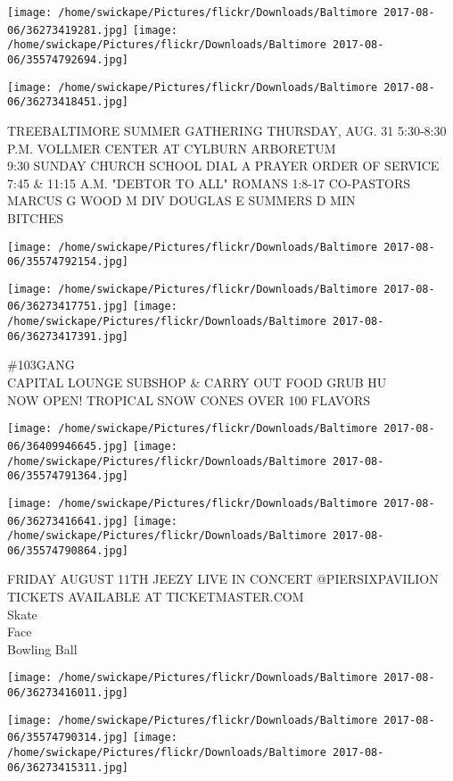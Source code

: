 \documentclass[10pt,letterpaper]{article}
\begin{document}
\texttt{[image: /home/swickape/Pictures/flickr/Downloads/Baltimore 2017-08-06/36273419281.jpg]}
\texttt{[image: /home/swickape/Pictures/flickr/Downloads/Baltimore 2017-08-06/35574792694.jpg]}

\texttt{[image: /home/swickape/Pictures/flickr/Downloads/Baltimore 2017-08-06/36273418451.jpg]}

TREEBALTIMORE SUMMER GATHERING THURSDAY, AUG. 31 5:30{-}8:30 P.M. VOLLMER CENTER AT CYLBURN ARBORETUM\\
9:30 SUNDAY CHURCH SCHOOL DIAL A PRAYER ORDER OF SERVICE 7:45 \& 11:15 A.M. "DEBTOR TO ALL" ROMANS 1:8{-}17 CO{-}PASTORS MARCUS G WOOD M DIV DOUGLAS E SUMMERS D MIN\\
BITCHES
\pagebreak

\texttt{[image: /home/swickape/Pictures/flickr/Downloads/Baltimore 2017-08-06/35574792154.jpg]}

\vspace{0.25in}
\texttt{[image: /home/swickape/Pictures/flickr/Downloads/Baltimore 2017-08-06/36273417751.jpg]}
\texttt{[image: /home/swickape/Pictures/flickr/Downloads/Baltimore 2017-08-06/36273417391.jpg]}

\#103GANG\\
CAPITAL LOUNGE SUBSHOP \& CARRY OUT FOOD GRUB HU\\
NOW OPEN!  TROPICAL SNOW CONES OVER 100 FLAVORS
\pagebreak

\texttt{[image: /home/swickape/Pictures/flickr/Downloads/Baltimore 2017-08-06/36409946645.jpg]}
\texttt{[image: /home/swickape/Pictures/flickr/Downloads/Baltimore 2017-08-06/35574791364.jpg]}

\texttt{[image: /home/swickape/Pictures/flickr/Downloads/Baltimore 2017-08-06/36273416641.jpg]}
\texttt{[image: /home/swickape/Pictures/flickr/Downloads/Baltimore 2017-08-06/35574790864.jpg]}

FRIDAY AUGUST 11TH JEEZY LIVE IN CONCERT @PIERSIXPAVILION TICKETS AVAILABLE AT TICKETMASTER.COM\\
Skate\\
Face\\
Bowling Ball
\pagebreak

\texttt{[image: /home/swickape/Pictures/flickr/Downloads/Baltimore 2017-08-06/36273416011.jpg]}

\vspace{0.25in}
\texttt{[image: /home/swickape/Pictures/flickr/Downloads/Baltimore 2017-08-06/35574790314.jpg]}
\texttt{[image: /home/swickape/Pictures/flickr/Downloads/Baltimore 2017-08-06/36273415311.jpg]}
\end{document}

